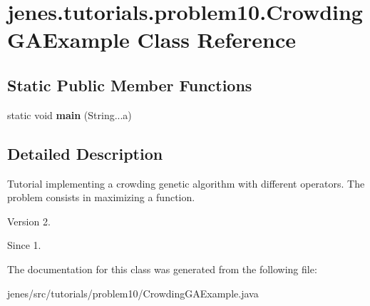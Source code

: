 \hypertarget{classjenes_1_1tutorials_1_1problem10_1_1_crowding_g_a_example}{\section{jenes.\-tutorials.\-problem10.\-Crowding\-G\-A\-Example Class Reference}
\label{classjenes_1_1tutorials_1_1problem10_1_1_crowding_g_a_example}
}
\subsection*{Static Public Member Functions}
\begin{DoxyCompactItemize}
\item 
\hypertarget{classjenes_1_1tutorials_1_1problem10_1_1_crowding_g_a_example_a847763f724496b95a266a6fe2b54c3d7}{static void {\bfseries main} (String...\-a)}\label{classjenes_1_1tutorials_1_1problem10_1_1_crowding_g_a_example_a847763f724496b95a266a6fe2b54c3d7}

\end{DoxyCompactItemize}


\subsection{Detailed Description}
Tutorial implementing a crowding genetic algorithm with different operators. The problem consists in maximizing a function.

\begin{DoxyVersion}{Version}
2. 
\end{DoxyVersion}
\begin{DoxySince}{Since}
1. 
\end{DoxySince}


The documentation for this class was generated from the following file\-:\begin{DoxyCompactItemize}
\item 
jenes/src/tutorials/problem10/Crowding\-G\-A\-Example.\-java\end{DoxyCompactItemize}
